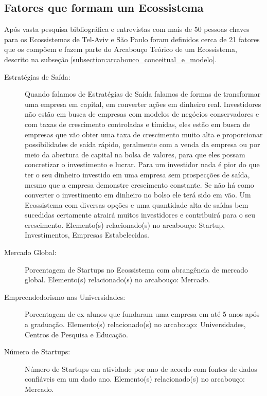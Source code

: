 \subsection{Fatores que formam um Ecossistema}
\label{subsection:fatores_que_formam_um_ecossistema}

Após vasta pesquisa bibliográfica e entrevistas com mais de 50 pessoas chaves para os Ecossistemas de Tel-Aviv e São Paulo foram definidos cerca de 21 fatores que os compõem e fazem parte do Arcabouço Teórico de um Ecossistema, descrito na subseção \ref{subsection:arcabouco_conceitual_e_modelo}. 

\begin{description}

  \item [Estratégias de Saída:] Quando falamos de Estratégias de Saída falamos de formas de transformar uma empresa em capital, em converter ações em dinheiro real. Investidores não estão em busca de empresas com modelos de negócios conservadores e com taxas de crescimento controladas e tímidas, eles estão em busca de empresas que vão obter uma taxa de crescimento muito alta e proporcionar possibilidades de saída rápido, geralmente com a venda da empresa ou por meio da abertura de capital na bolsa de valores, para que eles possam concretizar o investimento e lucrar. Para um investidor nada é pior do que ter o seu dinheiro investido em uma empresa sem prospecções de saída, mesmo que a empresa demonstre crescimento constante. Se não há como converter o investimento em dinheiro no bolso ele terá sido em vão. Um Ecossistema com diversas opções e uma quantidade alta de saídas bem sucedidas certamente atrairá muitos investidores e contribuirá para o seu crescimento. Elemento(s) relacionado(s) no arcabouço: Startup, Investimentos, Empresas Estabelecidas.

  \item [Mercado Global:] Porcentagem de Startups no Ecossistema com abrangência de mercado global. Elemento(s) relacionado(s) no arcabouço: Mercado.

  \item [Empreendedorismo nas Universidades:] Porcentagem de ex-alunos que fundaram uma empresa em até 5 anos após a graduação. Elemento(s) relacionado(s) no arcabouço: Universidades, Centros de Pesquisa e Educação.

  \item [Número de Startups:] Número de Startups em atividade por ano de acordo com fontes de dados confiáveis em um dado ano. Elemento(s) relacionado(s) no arcabouço: Mercado.


\end{description}
